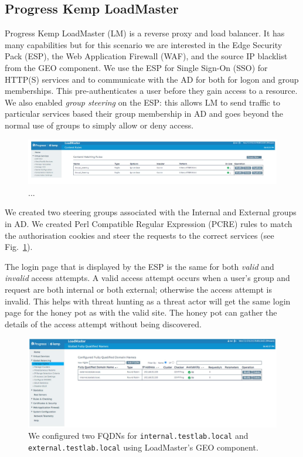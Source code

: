 \subsection{Progress Kemp LoadMaster}

Progress Kemp LoadMaster (LM) is a reverse proxy and load balancer.
It has many capabilities but for this scenario we are interested in
the Edge Security Pack (ESP), the Web Application Firewall (WAF), and
the source IP blacklist from the GEO component.  We use the ESP for
Single Sign-On (SSO) for HTTP(S) services and to communicate with the
AD for both for logon and group memberships.  This pre-authenticates a
user before they gain access to a resource.  We also enabled
\textit{group steering} on the ESP: this allows LM to send traffic to
particular services based their group membership in AD and goes beyond
the normal use of groups to simply allow or deny access.

\begin{figure}
  \centerline{\includegraphics[width=\columnwidth]{img/loadmaster-pcre-rules}}
  \caption{...}\label{fig:loadmaster-pcre-rules}
\end{figure}

We created two steering groups associated with the Internal and
External groups in AD.  We created Perl Compatible Regular Expression
(PCRE) rules to match the authorisation cookies and steer the requests
to the correct services (see Fig.~\ref{fig:loadmaster-pcre-rules}).

The login page that is displayed by the ESP is the same for both
\textit{valid} and \textit{invalid} access attempts.  A valid access
attempt occurs when a user's group and request are both internal or
both external; otherwise the access attempt is invalid.  This helps
with threat hunting as a threat actor will get the same login page for
the honey pot as with the valid site.  The honey pot can gather the
details of the access attempt without being discovered.

\begin{figure}
  \centerline{\includegraphics[width=\columnwidth]{img/loadmaster-geo}}
  \caption{We configured two FQDNs for \texttt{internal.testlab.local}
    and \texttt{external.testlab.local} using LoadMaster's GEO
    component.}\label{fig:loadmaster-geo}
\end{figure}

